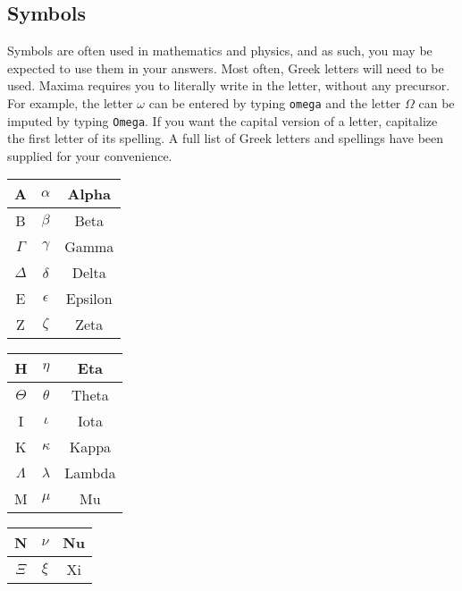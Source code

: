 \documentclass[a4paper]{article}
\newcommand{\stack}[1]{{\color{red}\tt #1}}
\begin{document}
\begin{multicols}{2}

\section*{Symbols}
Symbols are often used in mathematics and physics, and as such, you may be expected to use them in your answers. Most often, Greek letters will need to be used. Maxima requires you to literally write in the letter, without any precursor. For example, the letter $\omega$ can be entered by typing \stack{omega} and the letter $\Omega$ can be imputed by typing \stack{Omega}. If you want the capital version of a letter, capitalize the first letter of its spelling. A full list of Greek letters and spellings have been supplied for your convenience.
\begin{table}[H]
\begin{minipage}{0.22\linewidth}
\centering
\begin{tabular}{|c|c|c|} \hline
A & $\alpha$ & Alpha\\ \hline
B & $\beta$ & Beta\\ \hline
$\Gamma$ & $\gamma$ & Gamma \\ \hline
$\Delta$ & $\delta$ & Delta \\ \hline
E & $\epsilon$ & Epsilon \\ \hline
Z & $\zeta$ & Zeta \\ \hline
\end{tabular}
\end{minipage}
\hspace{0.2cm}
\begin{minipage}{0.22\linewidth}
\centering
\begin{tabular}{|c|c|c|} \hline
H & $\eta$ & Eta \\ \hline
$\Theta$ & $\theta$ & Theta \\ \hline
I & $\iota$ & Iota \\ \hline
K & $\kappa$ & Kappa \\ \hline
$\Lambda$ & $\lambda$ & Lambda \\ \hline
M & $\mu$ & Mu \\ \hline
\end{tabular}
\end{minipage}
\hspace{0.2cm}
\begin{minipage}{0.22\linewidth}
\centering
\begin{tabular}{|c|c|c|} \hline
N & $\nu$ & Nu \\ \hline
$\Xi$ & $\xi$ & Xi \\ \hline

\end{tabular}
\end{minipage}
\end{table}
\end{multicols}
\end{document}
